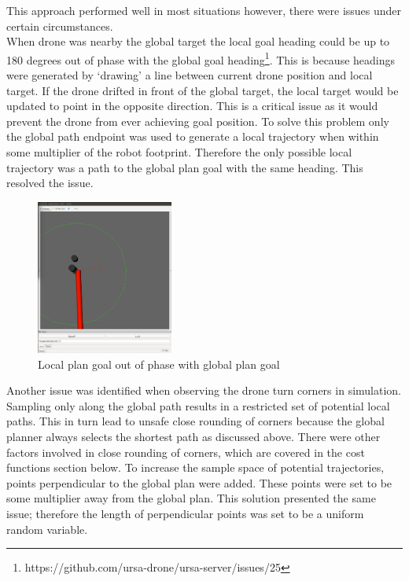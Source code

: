 \documentclass[capstone_report.tex]{subfiles}
\begin{document}
This approach performed well in most situations however, there were issues under certain circumstances. \\

When drone was nearby the global target the local goal heading could be up to 180 degrees out of phase with the global goal heading\footnote{https://github.com/ursa-drone/ursa-server/issues/25}.  This is because headings were generated by ‘drawing’ a line between current drone position and local target.  If the drone drifted in front of the global target, the local target would be updated to point in the opposite direction.  This is a critical issue as it would prevent the drone from ever achieving goal position.  To solve this problem only the global path endpoint was used to generate a local trajectory when within some multiplier of the robot footprint.  Therefore the only possible local trajectory was a path to the global plan goal with the same heading.  This resolved the issue.

\begin{figure}[H]
    \centering
    \includegraphics[width=0.4\textwidth]{imgs/out_of_phase.png}
    \caption{Local plan goal out of phase with global plan goal\label{fig:lp_gp_out_of_phase}}
\end{figure}

Another issue was identified when observing the drone turn corners in simulation.  Sampling only along the global path results in a restricted set of potential local paths.  This in turn lead to unsafe close rounding of corners because the global planner always selects the shortest path as discussed above.  There were other factors involved in close rounding of corners, which are covered in the cost functions section below.  To increase the sample space of potential trajectories, points perpendicular to the global plan were added.  These points were set to be some multiplier away from the global plan.  This solution presented the same issue; therefore the length of perpendicular points was set to be a uniform random variable.
\end{document}
